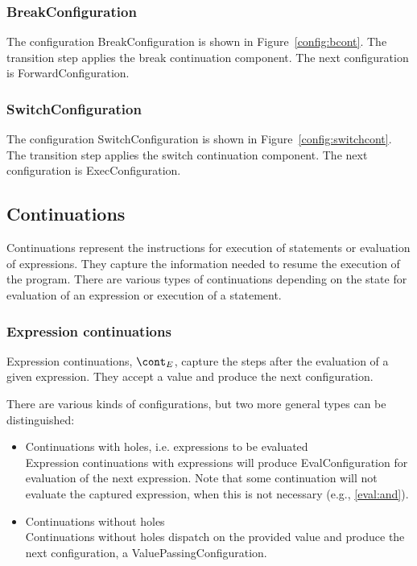 \documentclass[a4paper,oneside]{article}
\begin{document}
\subsubsection{BreakConfiguration}
\label{subsubsec:breakconfig}

The configuration BreakConfiguration is shown in Figure~\ref{config:bcont}.
The transition step applies the break continuation component.
The next configuration is ForwardConfiguration.


\subsubsection{SwitchConfiguration}
\label{subsubsec:switchconfig}

The configuration SwitchConfiguration is shown in Figure~\ref{config:switchcont}.
The transition step applies the switch continuation component.
The next configuration is ExecConfiguration.


\subsection{Continuations}
\label{subsec:continuations-definition}

Continuations represent the instructions for execution of statements or evaluation of expressions.
They capture the information needed to resume the execution of the program.
There are various types of continuations depending on the state for evaluation of an expression or execution of a statement.


\subsubsection{Expression continuations}
\label{subsubsec:expression-continuations}

Expression continuations, $\econt$, capture the steps after the evaluation of a given expression.
They accept a value and produce the next configuration.

There are various kinds of configurations, but two more general types can be distinguished:

\begin{itemize}
    \item Continuations with holes, i.e. expressions to be evaluated\\
        Expression continuations with expressions will produce EvalConfiguration for evaluation of the next expression.
        Note that some continuation will not evaluate the captured expression, when this is not necessary (e.g., \eqref{eval:and}).

    \item Continuations without holes\\
        Continuations without holes dispatch on the provided value and produce the next configuration, a ValuePassingConfiguration.

\end{itemize}
\end{document}
